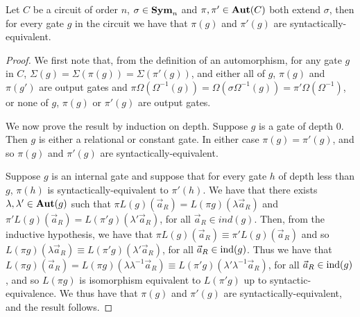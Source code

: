 \documentclass[../paper.tex]{subfiles}
\begin{document}
\begin{lem}
  Let $C$ be a circuit of order $n$, $\sigma \in \text{\textbf{Sym}}_n$ and $\pi, \pi' \in
  \text{\textbf{Aut}}(C)$ both extend $\sigma$, then for every gate $g$ in the circuit we have
  that $\pi (g)$ and $\pi'(g)$ are syntactically-equivalent.
  \label{lem:permutation-extending-syntactic-equivalence}
\end{lem}
\begin{proof}
  We first note that, from the definition of an automorphism, for any gate $g$
  in $C$, $\Sigma (g) = \Sigma (\pi (g)) = \Sigma (\pi' (g))$, and either all of
  $g$, $\pi (g)$ and $\pi (g')$ are output gates and $\pi \Omega
  (\Omega^{-1}(g)) = \Omega (\sigma \Omega^{-1}(g)) = \pi' \Omega
  (\Omega^{-1})$, or none of $g$, $\pi(g)$ or $\pi' (g)$ are output gates.
  
  We now prove the result by induction on depth. Suppose $g$ is a gate of depth
  $0$. Then $g$ is either a relational or constant gate. In either case $\pi (g)
  = \pi' (g)$, and so $\pi(g)$ and $\pi'(g)$ are syntactically-equivalent.

  Suppose $g$ is an internal gate and suppose that for every gate $h$ of depth
  less than $g$, $\pi (h)$ is syntactically-equivalent to $\pi'(h)$. We have
  that there exists $\lambda, \lambda' \in \text{\textbf{Aut}}(g)$ such that $\pi
  L(g)(\vec{a}_R) = L(\pi g) (\lambda \vec{a}_R)$ and $\pi' L(g)(\vec{a}_R) =
  L(\pi' g)(\lambda' \vec{a}_R)$, for all $\vec{a}_R \in ind(g)$. Then, from the
  inductive hypothesis, we have that $\pi L(g)(\vec{a}_R) \equiv \pi
  'L(g)(\vec{a}_R)$ and so $L(\pi g)(\lambda \vec{a}_R) \equiv L(\pi' g)
  (\lambda' \vec{a}_R)$, for all $\vec{a}_R \in \text{\upshape ind}(g)$. Thus we have that
  $L(\pi g) (\vec{a}_R) = L (\pi g) (\lambda \lambda^{-1}\vec{a}_R) \equiv
  L(\pi' g) (\lambda' \lambda^{-1}\vec{a}_R)$, for all $\vec{a}_R \in \text{\upshape ind}(g)$,
  and so $L(\pi g)$ is isomorphism equivalent to $L(\pi'g)$ up to
  syntactic-equivalence. We thus have that $\pi (g) $ and $\pi' (g)$ are
  syntactically-equivalent, and the result follows.

  
\end{proof}
\end{document}
